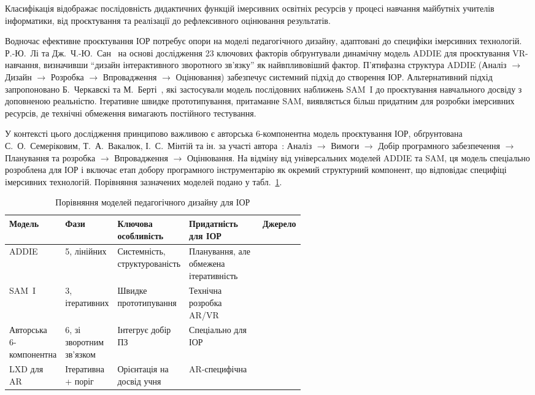 Класифікація відображає послідовність дидактичних функцій імерсивних освітніх ресурсів у процесі навчання майбутніх учителів інформатики, від проєктування та реалізації до рефлексивного оцінювання результатів.

Водночас ефективне проєктування ІОР потребує опори на моделі педагогічного дизайну, адаптовані до специфіки імерсивних технологій. Р.-Ю.~Лі та Дж.~Ч.-Ю.~Сан~\cite{Li2024ADDIE} на основі дослідження 23 ключових факторів обґрунтували динамічну модель ADDIE для проєктування VR-навчання, визначивши ``дизайн інтерактивного зворотного зв'язку'' як найвпливовіший фактор. П'ятифазна структура ADDIE (Аналіз $\to$ Дизайн $\to$ Розробка $\to$ Впровадження $\to$ Оцінювання) забезпечує системний підхід до створення ІОР. Альтернативний підхід запропоновано Б.~Черкавскі та М.~Берті~\cite{Czerkawski2021LXD}, які застосували модель послідовних наближень SAM~I до проєктування навчального досвіду з доповненою реальністю. Ітеративне швидке прототипування, притаманне SAM, виявляється більш придатним для розробки імерсивних ресурсів, де технічні обмеження вимагають постійного тестування.

У контексті цього дослідження принципово важливою є авторська 6-компонентна модель проєктування ІОР, обґрунтована С.~О.~Семеріковим, Т.~А.~Вакалюк, І.~С.~Мінтій та ін. за участі автора~\cite{Semerikov2022IERDesign}: Аналіз $\to$ Вимоги $\to$ Добір програмного забезпечення $\to$ Планування та розробка $\to$ Впровадження $\to$ Оцінювання. На відміну від універсальних моделей ADDIE та SAM, ця модель спеціально розроблена для ІОР і включає етап добору програмного інструментарію як окремий структурний компонент, що відповідає специфіці імерсивних технологій. Порівняння зазначених моделей подано у табл.~\ref{tab:design_models}.

\begin{table}
\caption{Порівняння моделей педагогічного дизайну для ІОР}\label{tab:design_models}\small
\begin{tabularx}{\linewidth}{|p{0.15\linewidth}|p{0.16\linewidth}|X|p{0.25\linewidth}|c|}
\hline
\hfil \textbf{Модель} & \hfil \textbf{Фази} & \textbf{Ключова особливість} & \hfil \textbf{Придатність для ІОР} & \textbf{Джерело} \\
\hline
ADDIE & 5, лінійних & Системність, структурованість & Планування, але обмежена ітеративність & \cite{Li2024ADDIE} \\
\hline
SAM~I & 3, ітеративних & Швидке прототипування & Технічна розробка AR/VR & \cite{Czerkawski2021LXD} \\
\hline
Авторська 6-компо\-нентна & 6, зі зворотним зв'язком & Інтегрує добір ПЗ & Спеціально для ІОР & \cite{Semerikov2022IERDesign} \\
\hline
LXD для AR & Ітеративна + поріг & Орієнтація на досвід учня & AR-специфічна & \cite{Czerkawski2021LXD} \\
\hline
\end{tabularx}
	
\end{table}


